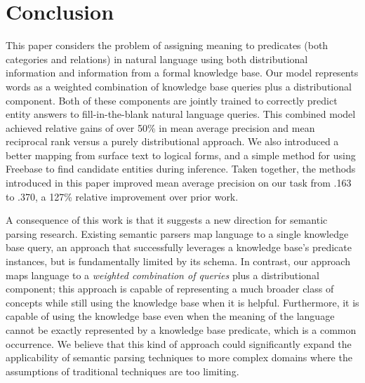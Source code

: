 \documentclass[11pt]{article}
\begin{document}
\section{Conclusion}
\label{sec:conclusion}

This paper considers the problem of assigning meaning to predicates (both
categories and relations) in natural language using both distributional
information and information from a formal knowledge base. Our model represents
words as a weighted combination of knowledge base queries plus a distributional
component. Both of these components are jointly trained to correctly predict
entity answers to fill-in-the-blank natural language queries. This combined
model achieved relative gains of over 50\% in mean average precision and mean
reciprocal rank versus a purely distributional approach.  We also introduced a
better mapping from surface text to logical forms, and a simple method for
using Freebase to find candidate entities during inference.  Taken together,
the methods introduced in this paper improved mean average precision on our
task from .163 to .370, a 127\% relative improvement over prior work.

A consequence of this work is that it suggests a new direction for semantic
parsing research. Existing semantic parsers map language to a single knowledge
base query, an approach that successfully leverages a knowledge base's
predicate instances, but is fundamentally limited by its schema. In contrast,
our approach maps language to a \emph{weighted combination of queries} plus a
distributional component; this approach is capable of representing a much
broader class of concepts while still using the knowledge base when it is
helpful. Furthermore, it is capable of using the knowledge base even when the
meaning of the language cannot be exactly represented by a knowledge base
predicate, which is a common occurrence. We believe that this kind of approach
could significantly expand the applicability of semantic parsing techniques to
more complex domains where the assumptions of traditional techniques are too
limiting.




\end{document}
